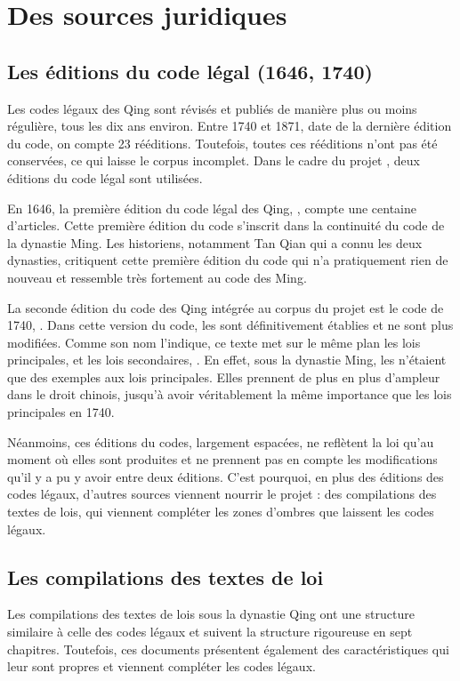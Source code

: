  \section{Des sources juridiques}
    \subsection{Les éditions du code légal (1646, 1740)}

Les codes légaux des Qing sont révisés et publiés de manière plus ou moins régulière, tous les dix ans environ. Entre 1740 et 1871, date de la dernière édition du code, on compte 23 rééditions. Toutefois, toutes ces rééditions n'ont pas été conservées, ce qui laisse le corpus incomplet. Dans le cadre du projet \COREL, deux éditions du code légal sont utilisées. 

En 1646, la première édition du code légal des Qing, \dqlj, compte une centaine d'articles. Cette première édition du code s'inscrit dans la continuité du code de la dynastie Ming. Les historiens, notamment Tan Qian  qui a connu les deux dynasties, critiquent cette première édition du code qui n'a pratiquement rien de nouveau et ressemble très fortement au code des Ming. 

La seconde édition du code des Qing intégrée au corpus du projet est le code de 1740, \dq. Dans cette version du code, les \lu sont définitivement établies et ne sont plus modifiées. Comme son nom l'indique, ce texte met sur le même plan les lois principales, \lu et les lois secondaires, \li. En effet, sous la dynastie Ming, les \li n'étaient que des exemples aux lois principales. Elles prennent de plus en plus d'ampleur dans le droit chinois, jusqu'à avoir véritablement la même importance que les lois principales en 1740.

Néanmoins, ces éditions du codes, largement espacées, ne reflètent la loi qu'au moment où elles sont produites et ne prennent pas en compte les modifications qu'il y a pu y avoir entre deux éditions. C'est pourquoi, en plus des éditions des codes légaux, d'autres sources viennent nourrir le projet \COREL : des compilations des textes de lois, qui viennent compléter les zones d'ombres que laissent les codes légaux.

\subsection{Les compilations des textes de loi}

Les compilations des textes de lois sous la dynastie Qing ont une structure similaire à celle des codes légaux et suivent la structure rigoureuse en sept chapitres. Toutefois, ces documents présentent également des caractéristiques qui leur sont propres et viennent compléter les codes légaux. 


